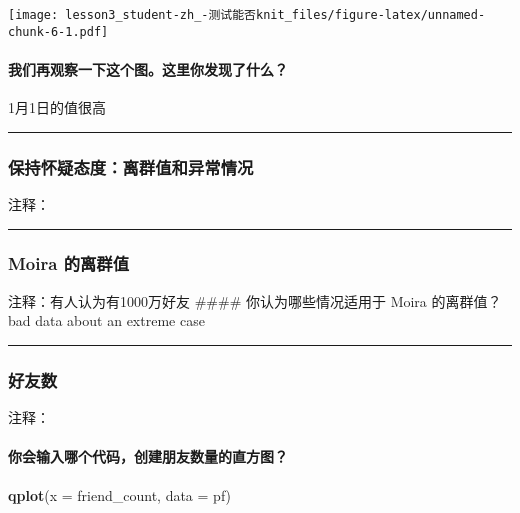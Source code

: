 \documentclass[]{article}
\newenvironment{Shaded}{\begin{snugshade}}{\end{snugshade}}
\newcommand{\DataTypeTok}[1]{\textcolor[rgb]{0.13,0.29,0.53}{#1}}
\newcommand{\KeywordTok}[1]{\textcolor[rgb]{0.13,0.29,0.53}{\textbf{#1}}}
\newcommand{\NormalTok}[1]{#1}
\let\oldparagraph\paragraph
\renewcommand{\paragraph}[1]{\oldparagraph{#1}\mbox{}}
\begin{document}
\texttt{[image: lesson3\_student-zh\_-测试能否knit\_files/figure-latex/unnamed-chunk-6-1.pdf]}

\paragraph{我们再观察一下这个图。这里你发现了什么？}

1月1日的值很高

\begin{center}\rule{0.5\linewidth}{\linethickness}\end{center}

\subsubsection{保持怀疑态度：离群值和异常情况}

注释：

\begin{center}\rule{0.5\linewidth}{\linethickness}\end{center}

\hypertarget{moira-}{%
\subsubsection{Moira 的离群值}\label{moira-}}

注释：有人认为有1000万好友 \#\#\#\# 你认为哪些情况适用于 Moira
的离群值？ bad data about an extreme case

\begin{center}\rule{0.5\linewidth}{\linethickness}\end{center}

\subsubsection{好友数}

注释：

\paragraph{你会输入哪个代码，创建朋友数量的直方图？}

\begin{Shaded}
\begin{Highlighting}[]
\KeywordTok{qplot}\NormalTok{(}\DataTypeTok{x =}\NormalTok{ friend_count, }\DataTypeTok{data =}\NormalTok{ pf)}
\end{Highlighting}
\end{Shaded}
\end{document}
